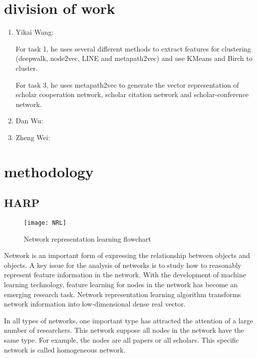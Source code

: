 \documentclass[conference]{IEEEtran}
\begin{document}
\section{division of work}
\begin{enumerate}
\item Yikai Wang: 

For task 1, he uses several different methods to extract features for clustering (deepwalk, node2vec, LINE and metapath2vec) and use KMeans and Birch to cluster.

For task 3, he uses metapath2vec to generate the vector representation of    scholar cooperation network, scholar citation network and scholar-conference network.
\item Dan Wu:
\item Zheng Wei:
\end{enumerate}
\section{methodology}
\subsection{HARP}
\begin{figure}[h]
\centering
\texttt{[image: NRL]}
\caption{Network representation learning flowchart}
\label{fig_NRL}
\end{figure}
Network is an important form of expressing the relationship between objects and objects. A key issue for the analysis of networks is to study how to reasonably represent feature information in the network. With the development of machine learning technology, feature learning for nodes in the network has become an emerging research task. Network representation learning algorithm transforms network information into low-dimensional dense real vector. 

In all types of networks, one important type has attracted the attention of a large number of researchers. This network suppose all nodes in the network have the same type. For example, the nodes are all papers or all scholars. This specific network is called homogeneous network. 
\end{document}
